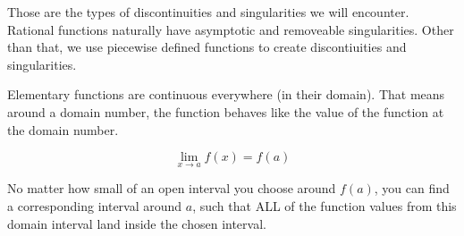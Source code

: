 \documentclass{ximera}
\begin{document}
\begin{example}
\begin{image}
\end{image}





\end{example}







Those are the types of discontinuities and singularities we will encounter.  Rational functions naturally have asymptotic and removeable singularities.  Other than that, we use piecewise defined functions to create discontiuities and singularities.

Elementary functions are continuous everywhere (in their domain).  That means around a domain number, the function behaves like the value of the function at the domain number.


\[      \lim_{x \to a} f(x) = f(a)                   \]



No matter how small of an open interval you choose around $f(a)$, you can find a corresponding interval around $a$, such that ALL of the function values from this domain interval land inside the chosen interval.
\end{document}
